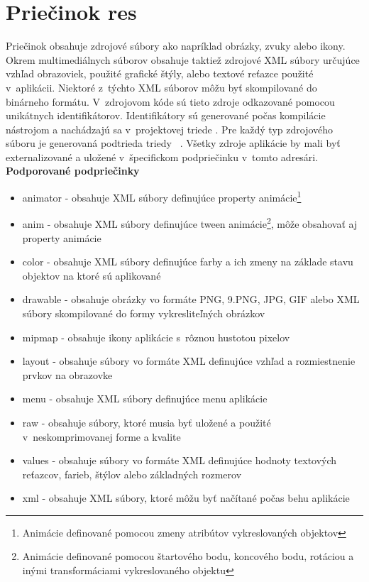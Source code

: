 \section{Priečinok res}
\label{res}
Priečinok  obsahuje zdrojové súbory ako napríklad obrázky, zvuky alebo ikony. Okrem multimediálnych súborov obsahuje taktiež zdrojové XML súbory určujúce vzhľad obrazoviek, použité grafické štýly, alebo textové reťazce použité v~aplikácii. Niektoré z~týchto XML súborov môžu byť skompilované do binárneho formátu. V~zdrojovom kóde sú tieto zdroje odkazované pomocou unikátnych identifikátorov. Identifikátory sú generované počas kompilácie nástrojom  a nachádzajú sa v~projektovej triede . Pre každý typ zdrojového súboru je generovaná podtrieda triedy ~\cite{accessingRes}. Všetky zdroje aplikácie by mali byť externalizované a uložené v~špecifickom podpriečinku v~tomto adresári. \newpage
\textbf{Podporované podpriečinky}~\cite{providingRes}
\begin{itemize}
\item animator - obsahuje XML súbory definujúce property animácie\footnote{Animácie definované pomocou zmeny atribútov vykreslovaných objektov}
\item anim - obsahuje XML súbory definujúce tween animácie\footnote{Animácie definované pomocou štartového bodu, koncového bodu, rotáciou a inými transformáciami vykreslovaného objektu}, môže obsahovať aj property animácie
\item color - obsahuje XML súbory definujúce farby a ich zmeny na základe stavu objektov na ktoré sú aplikované
\item drawable - obsahuje obrázky vo formáte PNG, 9.PNG, JPG, GIF alebo XML súbory skompilované do formy vykresliteľných obrázkov
\item mipmap - obsahuje ikony aplikácie s~rôznou hustotou pixelov
\item layout - obsahuje súbory vo formáte XML definujúce vzhľad a rozmiestnenie prvkov na obrazovke
\item menu - obsahuje XML súbory definujúce menu aplikácie
\item raw - obsahuje súbory, ktoré musia byť uložené a použité v~neskomprimovanej forme a kvalite
\item values - obsahuje súbory vo formáte XML definujúce hodnoty textových reťazcov, farieb, štýlov alebo základných rozmerov
\item xml - obsahuje XML súbory, ktoré môžu byť načítané počas behu aplikácie
\end{itemize}

